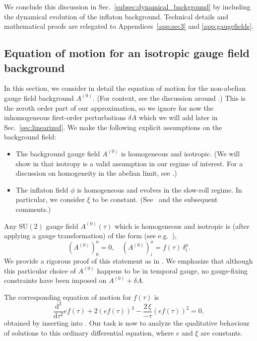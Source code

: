 We conclude this discussion in Sec.~\ref{subsec:dynamical_background} by including the dynamical evolution of the inflaton background. Technical details and mathematical proofs are relegated to Appendices~\ref{app:sec3} and \ref{app:gaugefields}.

\subsection{\label{subsec:Isotropic}Equation of motion for an isotropic gauge field background}

In this section, we consider in detail the equation of motion for the non-abelian gauge field background $A^{(0)}$. (For context, see the discussion around .) This is the zeroth order part of our approximation, so we ignore for now the inhomogeneous first-order perturbations $\delta A$ which we will add later in Sec.~\ref{sec:linearized}. We make the following explicit assumptions on the background field: 
\begin{itemize}
\item The background gauge field $A^{(0)}$ is homogeneous and isotropic. (We will show in  that isotropy is a valid assumption in our regime of interest. For a discussion on homogeneity in the abelian limit, see .) 
\item The inflaton field $\phi$ is homogeneous and evolves in the slow-roll regime. In particular, we consider $\xi$ to be constant. (See~ and the subsequent comments.) 
\end{itemize}
Any $\mathrm{SU}(2)$ gauge field $A^{(0)}(\tau)$ which is homogeneous and isotropic is (after applying a gauge transformation) of the form (see e.g.~\cite{Verbin:1989sg,Maleknejad:2012fw}),
\begin{equation}
(A^{(0)})_{0}^{a}=0,\quad(A^{(0)})_{i}^{a}=f(\tau)\,\delta_{i}^{a}.\label{eq:ansatz-A}
\end{equation}
We provide a rigorous proof of this statement as  in . We emphasize that although this particular choice of $A^{(0)}$ happens to be in temporal gauge, no gauge-fixing constraints have been imposed on $A^{(0)}+\delta A$. 

The corresponding equation of motion for $f(\tau)$ is 
\begin{equation}
\frac{\mathrm{d}^{2}}{\mathrm{d}\tau^{2}}ef(\tau)+2\left(ef(\tau)\right)^{3}-\frac{2\,\xi}{-\tau}(ef(\tau))^{2}=0,\label{eq:chromonatural_eom_final}
\end{equation}
obtained by inserting  into . Our task is now to analyze the qualitative behaviour of solutions to this ordinary differential equation, where $e$ and $\xi$ are constants.

